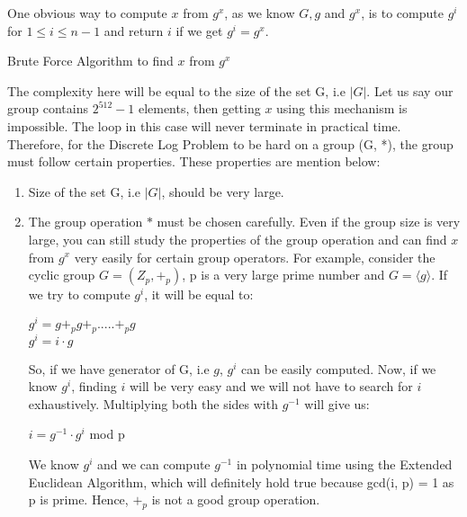 \documentclass[11pt]{article}
\begin{document}
\newline
One obvious way to compute $x$ from $g^x$, as we know $G, g$ and $g^x$, is to compute $g^i$ for $1 \leq i \leq n-1$ and return $i$ if we get $g^i = g^x$.
\begin{center}
    \begin{algorithm}
    \caption{Brute Force Algorithm to find $x$ from $g^x$}
    \end{algorithm}
\end{center}
The complexity here will be equal to the size of the set G, i.e $|G|$. Let us say our group contains $2^{512} - 1$ elements, then getting $x$ using this mechanism is impossible. The loop in this case will never terminate in practical time. Therefore, for the Discrete Log Problem to be hard on a group (G, *), the group must follow certain properties. These properties are mention below:
\begin{enumerate}
    \item Size of the set G, i.e $|G|$, should be very large.
    \item The group operation $*$ must be chosen carefully. Even if the group size is very large, you can still study the properties of the group operation and can find $x$ from $g^x$ very easily for certain group operators. For example, consider the cyclic group $G = (Z_p, +_p)$, p is a very large prime number and $G = \langle g \rangle$. If we try to compute $g^i$, it will be equal to:
    \begin{center}
        $g^i = g +_p g +_p ..... +_p g$\\
        $g^i = i\cdot g$
    \end{center}
    So, if we have generator of G, i.e $g$, $g^i$ can be easily computed. Now, if we know $g^i$, finding $i$ will be very easy and we will not have to search for $i$ exhaustively. Multiplying both the sides with $g^{-1}$ will give us:
    \begin{center}
        $i = g^{-1} \cdot g^i$ mod p
    \end{center}
    We know $g^i$ and we can compute $g^{-1}$ in polynomial time using the Extended Euclidean Algorithm, which will definitely hold true because gcd(i, p) = 1 as p is prime. Hence, $+_p$ is not a good group operation.
\end{enumerate}
\end{document}
